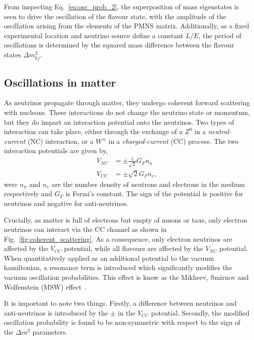 From inspecting Eq.~\ref{eq:osc_prob_2}, the superposition of mass eigenstates is seen to drive
the oscillation of the flavour state, with the amplitude of the oscillation arising from the
elements of the PMNS matrix. Additionally, as a fixed experimental location and neutrino source
define a constant $L/E$, the period of oscillations is determined by the squared mass difference
between the flavour states $\Delta m_{kj}^{2}$.

\subsection{Oscillations in matter} %
\label{sec:theory_oscillations_matter} %

As neutrinos propagate through matter, they undergo coherent forward scattering with nucleons.
These interactions do not change the neutrino state or momentum, but they do impart an interaction
potential onto the neutrinos. Two types of interaction can take place, either through the exchange
of a $Z^{0}$ in a \emph{neutral-current} (NC) interaction, or a $W^{\pm}$ in a
\emph{charged-current} (CC) process. The two interaction potentials are given by,
\begin{align} %
    V_{NC} & = \pm\frac{1}{\sqrt{2}}G_{F}n_{n} \\
    V_{CC} & = \pm\sqrt{2}G_{F}n_{e},
\end{align}
were $n_{n}$ and $n_{e}$ are the number density of neutrons and electrons in the medium
respectively and $G_{F}$ is Fermi's constant. The sign of the potential is positive for neutrinos
and negative for anti-neutrinos.

Crucially, as matter is full of electrons but empty of muons or taus, only electron neutrinos can
interact via the CC channel as shown in Fig.~\ref{fig:coherent_scattering}. As a consequence, only
electron neutrinos are affected by the $V_{CC}$ potential, while all flavours are affected by the
$V_{NC}$ potential. When quantitatively applied as an additional potential to the vacuum
hamiltonian, a resonance term is introduced which significantly modifies the vacuum oscillation
probabilities. This effect is know as the Mikheev, Smirnov and Wolfenstein (MSW)
effect~\cite{wolfenstein1978, mikheev1986}.

It is important to note two things. Firstly, a difference between neutrinos and anti-neutrinos is
introduced by the $\pm$ in the $V_{CC}$ potential. Secondly, the modified oscillation probability
is found to be non-symmetric with respect to the sign of the $\Delta m^{2}$ parameters.

